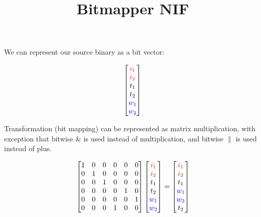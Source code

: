 \documentclass{article}
\title{Bitmapper NIF}
\begin{document}
\maketitle

We can represent our source binary as a bit vector:

\begin{equation}
  \label{eq:vec1}
  \begin{bmatrix}
    {\color{red} i_1} \\
    {\color{red} i_2} \\
    t_1 \\
    t_2 \\
    {\color{blue} w_1} \\
    {\color{blue} w_2}
  \end{bmatrix}
\end{equation}

Transformation (bit mapping) can be represented as matrix multiplication,
with exception that bitwise $\&$ is used instead of multiplication, and bitwise $\|$ is used instead of plus.

\begin{equation}
  \label{eq:trans1}
  \begin{bmatrix}
    1 & 0 &   0 & 0 &  0 & 0 \\
    0 & 1 &   0 & 0 &  0 & 0 \\
    0 & 0 &   1 & 0 &  0 & 0 \\
    0 & 0 &   0 & 0 &  1 & 0 \\
    0 & 0 &   0 & 0 &  0 & 1 \\
    0 & 0 &   0 & 1 &  0 & 0
  \end{bmatrix}
  \begin{bmatrix}
    {\color{red} i_1} \\
    {\color{red} i_2} \\
    t_1 \\
    t_2 \\
    {\color{blue} w_1} \\
    {\color{blue} w_2}
  \end{bmatrix}
  =
  \begin{bmatrix}
    {\color{red} i_1} \\
    {\color{red} i_2} \\
    t_1 \\
    {\color{blue} w_1} \\
    {\color{blue} w_2} \\
    t_2
  \end{bmatrix}
\end{equation}
\end{document}
